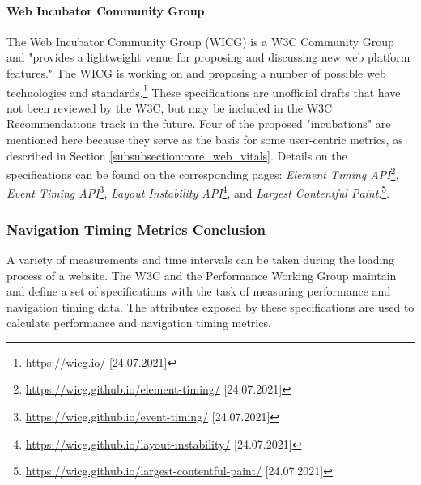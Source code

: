 
\paragraph{Web Incubator Community Group} %

The Web Incubator Community Group (WICG) is a W3C Community Group and "provides a lightweight venue for proposing and discussing new web platform features." %
The WICG is working on and proposing a number of possible web technologies and standards.\footnote{\url{https://wicg.io/} [24.07.2021]}
These specifications are unofficial drafts that have not been reviewed by the W3C, but may be included in the W3C Recommendations track in the future.
Four of the proposed "incubations" are mentioned here because they serve as the basis for some user-centric metrics, as described in Section \ref{subsubsection:core_web_vitals}.
Details on the specifications can be found on the corresponding pages:
\textit{Element Timing API}\footnote{\url{https://wicg.github.io/element-timing/} [24.07.2021]}, 
\textit{Event Timing API}\footnote{\url{https://wicg.github.io/event-timing/} [24.07.2021]},
\textit{Layout Instability API}\footnote{\url{https://wicg.github.io/layout-instability/} [24.07.2021]}, and
\textit{Largest Contentful Paint}.\footnote{\url{https://wicg.github.io/largest-contentful-paint/} [24.07.2021]}.




\subsubsection{Navigation Timing Metrics Conclusion} %

A variety of measurements and time intervals can be taken during the loading process of a website.
The W3C and the Performance Working Group maintain and define a set of specifications with the task of measuring performance and navigation timing data.
The attributes exposed by these specifications are used to calculate performance and navigation timing metrics.

